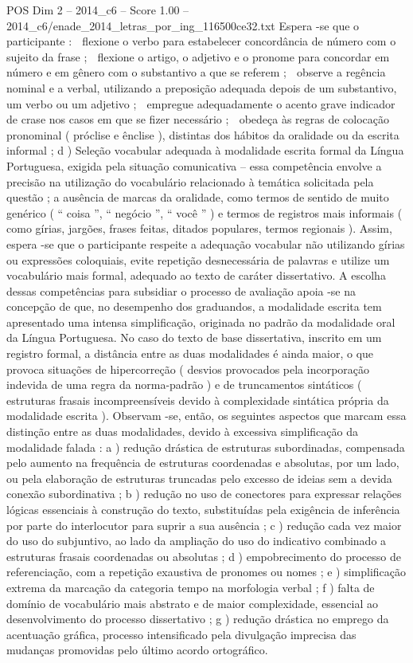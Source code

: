 \begin{textsample}{POS Dim 2 – 2014\_c6 – Score 1.00 – 2014\_c6/enade\_2014\_letras\_por\_ing\_116500ce32.txt}
Espera -se que o participante :  flexione o verbo para estabelecer concordância de número com o sujeito da frase ;  flexione o artigo, o adjetivo e o pronome para concordar em número e em gênero com o substantivo a que se referem ;  observe a regência nominal e a verbal, utilizando a preposição adequada depois de um substantivo, um verbo ou um adjetivo ;  empregue adequadamente o acento grave indicador de crase nos casos em que se fizer necessário ;  obedeça às regras de colocação pronominal ( próclise e ênclise ), distintas dos hábitos da oralidade ou da escrita informal ; d ) Seleção vocabular adequada à modalidade escrita formal da Língua Portuguesa, exigida pela situação comunicativa – essa competência envolve a precisão na utilização do vocabulário relacionado à temática solicitada pela questão ; a ausência de marcas da oralidade, como termos de sentido de muito genérico ( “ coisa ”, “ negócio ”, “ você ” ) e termos de registros mais informais ( como gírias, jargões, frases feitas, ditados populares, termos regionais ).
Assim, espera -se que o participante respeite a adequação vocabular não utilizando gírias ou expressões coloquiais, evite repetição desnecessária de palavras e utilize um vocabulário mais formal, adequado ao texto de caráter dissertativo.
A escolha dessas competências para subsidiar o processo de avaliação apoia -se na concepção de que, no desempenho dos graduandos, a modalidade escrita tem apresentado uma intensa simplificação, originada no padrão da modalidade oral da Língua Portuguesa.
No caso do texto de base dissertativa, inscrito em um registro formal, a distância entre as duas modalidades é ainda maior, o que provoca situações de hipercorreção ( desvios provocados pela incorporação indevida de uma regra da norma-padrão ) e de truncamentos sintáticos ( estruturas frasais incompreensíveis devido à complexidade sintática própria da modalidade escrita ).
Observam -se, então, os seguintes aspectos que marcam essa distinção entre as duas modalidades, devido à excessiva simplificação da modalidade falada : a ) redução drástica de estruturas subordinadas, compensada pelo aumento na frequência de estruturas coordenadas e absolutas, por um lado, ou pela elaboração de estruturas truncadas pelo excesso de ideias sem a devida conexão subordinativa ; b ) redução no uso de conectores para expressar relações lógicas essenciais à construção do texto, substituídas pela exigência de inferência por parte do interlocutor para suprir a sua ausência ; c ) redução cada vez maior do uso do subjuntivo, ao lado da ampliação do uso do indicativo combinado a estruturas frasais coordenadas ou absolutas ; d ) empobrecimento do processo de referenciação, com a repetição exaustiva de pronomes ou nomes ; e ) simplificação extrema da marcação da categoria tempo na morfologia verbal ; f ) falta de domínio de vocabulário mais abstrato e de maior complexidade, essencial ao desenvolvimento do processo dissertativo ; g ) redução drástica no emprego da acentuação gráfica, processo intensificado pela divulgação imprecisa das mudanças promovidas pelo último acordo ortográfico.

\end{textsample}
